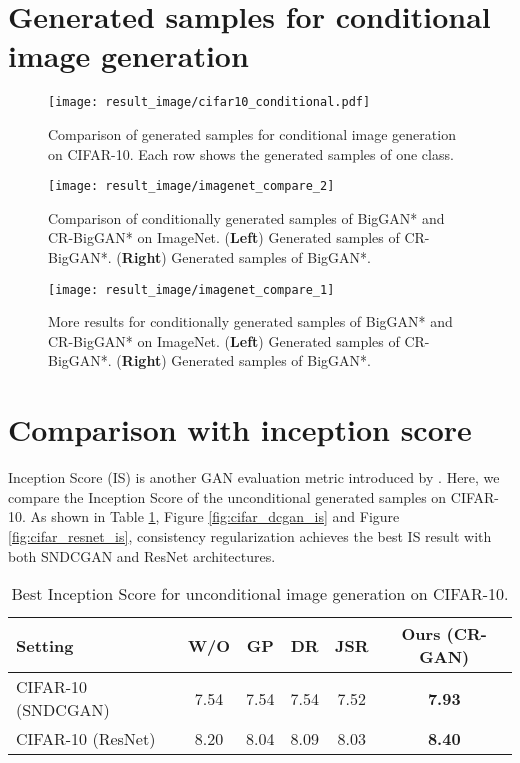\documentclass{article} \usepackage{iclr2020_conference,times}
\begin{document}
\section{Generated samples for conditional image generation}
\renewcommand{\thefigure}{E\arabic{figure}}
\setcounter{figure}{0}
\renewcommand{\thetable}{E\arabic{table}}
\setcounter{table}{0}

\begin{figure}[hbt]
    \centering
    \texttt{[image: result\_image/cifar10\_conditional.pdf]}
    \caption{
    Comparison of generated samples for conditional image generation on CIFAR-10. Each row shows the generated samples of one class.
    }
    \label{fig:cifar_samples_conditional}
\end{figure}
\newpage
\begin{figure}[hbt!]
    \centering
    \texttt{[image: result\_image/imagenet\_compare\_2]}
    \caption{
        Comparison of conditionally generated samples of BigGAN* and CR-BigGAN* on ImageNet. (\textbf{Left}) Generated samples of CR-BigGAN*. (\textbf{Right}) Generated samples of BigGAN*. 
    }
    \label{fig:imagenet_ours}
\end{figure}
\begin{figure}[hbt!]
    \centering
    \texttt{[image: result\_image/imagenet\_compare\_1]}
    \caption{
    More results for conditionally generated samples of BigGAN* and CR-BigGAN* on ImageNet. (\textbf{Left}) Generated samples of CR-BigGAN*. (\textbf{Right}) Generated samples of BigGAN*. 
    }
    \label{fig:imagenet_baseline}
\end{figure}

\section {Comparison with inception score} \label{sec:is_section}
\renewcommand{\thefigure}{F\arabic{figure}}
\setcounter{figure}{0}
\renewcommand{\thetable}{F\arabic{table}}
\setcounter{table}{0}
Inception Score (IS) is another GAN evaluation metric introduced by \citet{salimans2016improved}. Here, we compare the Inception Score of the unconditional generated samples on CIFAR-10. As shown in Table \ref{tab:main_inception_comparision},  Figure \ref{fig:cifar_dcgan_is} and Figure \ref{fig:cifar_resnet_is}, consistency regularization achieves the best IS result with both SNDCGAN and ResNet architectures. 

\begin{table}[hbt]
\centering
\begin{tabular}{l|ccccc}
 \hline
Setting   & W/O &  GP & DR & JSR  & Ours (CR-GAN)\\ 
\hline
 CIFAR-10 (SNDCGAN)  & 7.54 & 7.54  & 7.54  & 7.52   & \textbf{7.93} \\
 CIFAR-10 (ResNet)  &8.20 & 8.04  & 8.09  & 8.03 &   \textbf{8.40}\\ 

 
 \hline \hline
\end{tabular}
\caption{Best Inception Score for unconditional image generation on CIFAR-10.
} 
\label{tab:main_inception_comparision}
\end{table}
\end{document}
